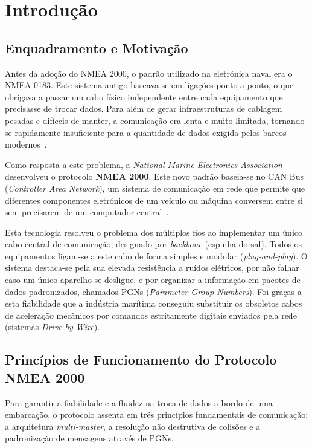 
\chapter{Introdução}
\label{chap:introducao}

\section{Enquadramento e Motivação}
Antes da adoção do NMEA 2000, o padrão utilizado na eletrónica naval era o NMEA 0183. Este sistema antigo baseava-se em ligações ponto-a-ponto, o que obrigava a passar um cabo físico independente entre cada equipamento que precisasse de trocar dados. Para além de gerar infraestruturas de cablagem pesadas e difíceis de manter, a comunicação era lenta e muito limitada, tornando-se rapidamente insuficiente para a quantidade de dados exigida pelos barcos modernos~\cite{tran2021marine}. 

Como resposta a este problema, a \textit{National Marine Electronics Association} desenvolveu o protocolo \textbf{NMEA 2000}. Este novo padrão baseia-se no CAN Bus (\textit{Controller Area Network}), um sistema de comunicação em rede que permite que diferentes componentes eletrónicos de um veículo ou máquina conversem entre si sem precisarem de um computador central~\cite{iec61162_3}.  

Esta tecnologia resolveu o problema dos múltiplos fios ao implementar um único cabo central de comunicação, designado por \textit{backbone} (espinha dorsal). Todos os equipamentos ligam-se a este cabo de forma simples e modular (\textit{plug-and-play}). O sistema destaca-se pela sua elevada resistência a ruídos elétricos, por não falhar caso um único aparelho se desligue, e por organizar a informação em pacotes de dados padronizados, chamados PGNs (\textit{Parameter Group Numbers}). Foi graças a esta fiabilidade que a indústria marítima conseguiu substituir os obsoletos cabos de aceleração mecânicos por comandos estritamente digitais enviados pela rede (sistemas \textit{Drive-by-Wire}).

\section{Princípios de Funcionamento do Protocolo NMEA 2000}
Para garantir a fiabilidade e a fluidez na troca de dados a bordo de uma embarcação, o protocolo assenta em três princípios fundamentais de comunicação: a arquitetura \textit{multi-master}, a resolução não destrutiva de colisões e a padronização de mensagens através de PGNs.

